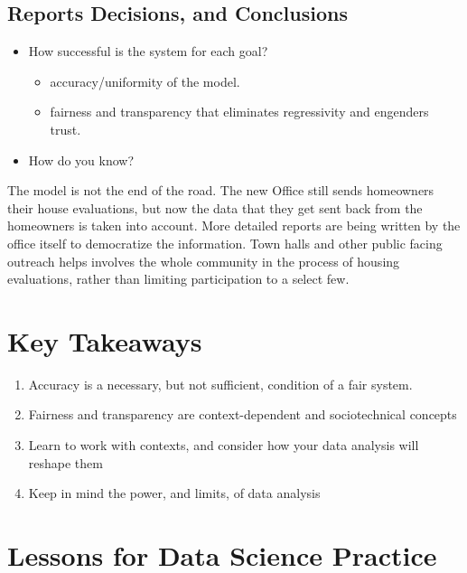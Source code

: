 \documentclass[
  letterpaper,
  DIV=11,
  numbers=noendperiod]{scrreprt}
\providecommand{\tightlist}{%
  \setlength{\itemsep}{0pt}\setlength{\parskip}{0pt}}\usepackage{longtable,booktabs,array}
\begin{document}
\hypertarget{reports-decisions-and-conclusions}{%
\subsection{Reports Decisions, and
Conclusions}\label{reports-decisions-and-conclusions}}

\begin{itemize}
\tightlist
\item
  How successful is the system for each goal?

  \begin{itemize}
  \tightlist
  \item
    accuracy/uniformity of the model.
  \item
    fairness and transparency that eliminates regressivity and engenders
    trust.
  \end{itemize}
\item
  How do you know?
\end{itemize}

The model is not the end of the road. The new Office still sends
homeowners their house evaluations, but now the data that they get sent
back from the homeowners is taken into account. More detailed reports
are being written by the office itself to democratize the information.
Town halls and other public facing outreach helps involves the whole
community in the process of housing evaluations, rather than limiting
participation to a select few.

\hypertarget{key-takeaways}{%
\section{Key Takeaways}\label{key-takeaways}}

\begin{enumerate}
\def\labelenumi{\arabic{enumi}.}
\item
  Accuracy is a necessary, but not sufficient, condition of a fair
  system.
\item
  Fairness and transparency are context-dependent and sociotechnical
  concepts
\item
  Learn to work with contexts, and consider how your data analysis will
  reshape them
\item
  Keep in mind the power, and limits, of data analysis
\end{enumerate}

\hypertarget{lessons-for-data-science-practice}{%
\section{Lessons for Data Science
Practice}\label{lessons-for-data-science-practice}}
\end{document}
